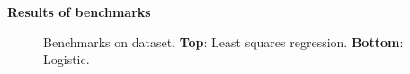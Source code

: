 \documentclass[french]{STIC_poster}
\begin{document}
\begin{frame}[t]
\begin{columns}[t]
\begin{column}{.48\linewidth}
\begin{nbox}[\textwidth]{\textbf{Results of benchmarks}}
\begin{figure}
                              \caption{Benchmarks on \textcolor{cyan}{\cite{haxby2001}} dataset. \textbf{Top}: Least squares regression. \textbf{Bottom}: Logistic. %
                                \textcolor{cyan}{\cite{dohmatob2014benchmarking}}}
                              \label{Fig:MSEtimes}
                            \end{figure}
				\end{nbox}
			\end{column}
			\hfill
		\end{columns}

                

\end{frame}
\end{document}

